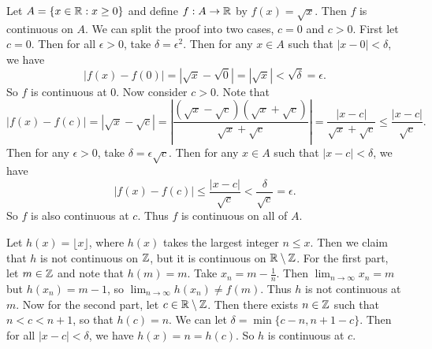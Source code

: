 \begin{example}
  Let $A = \{x \in \mathbb{R} : x \ge 0\}$ and define $f : A \to \mathbb{R}$
  by $f(x) = \sqrt{x}$. Then $f$ is continuous on $A$.
  We can split the proof into two cases, $c = 0$ and $c > 0$.
  First let $c = 0$. Then for all $\epsilon > 0$, take
  $\delta = \epsilon^2$. Then for any $x \in A$ such that
  $|x - 0| < \delta$, we have
  \[
    |f(x) - f(0)| = |\sqrt{x} - \sqrt{0}|
    = |\sqrt{x}| < \sqrt{\delta} = \epsilon
  .\]
  So $f$ is continuous at $0$. Now consider $c > 0$. Note that
  \[|f(x) - f(c)| = |\sqrt{x} - \sqrt{c}| = \left|\frac{(\sqrt{x} - \sqrt{c})(\sqrt{x} + \sqrt{c})}{\sqrt{x} + \sqrt{c}}\right| = \frac{|x - c|}{\sqrt{x} + \sqrt{c}} \le \frac{|x - c|}{\sqrt{c}}.\]
  Then for any $\epsilon > 0$, take $\delta = \epsilon \sqrt{c}$.
  Then for any $x \in A$ such that $|x - c| < \delta$, we have
  \[
  |f(x) - f(c)| \le \frac{|x - c|}{\sqrt{c}} < \frac{\delta}{\sqrt{c}} = \epsilon
  .\]
  So $f$ is also continuous at $c$. Thus $f$ is continuous on
  all of $A$.
\end{example}

\begin{example}
  Let $h(x) = \lfloor x \rfloor$, where $h(x)$ takes the
  largest integer $n \le x$. Then we claim that $h$ is
  not continuous on $\mathbb{Z}$, but it is continuous on $\mathbb{R} \setminus \mathbb{Z}$.
  For the first part, let $m \in \mathbb{Z}$ and note that $h(m) = m$.
  Take $x_n = m - \frac{1}{n}$. Then $\lim_{n \to \infty} x_n = m$
  but $h(x_n) = m - 1$, so $\lim_{n \to \infty} h(x_n) \ne f(m)$.
  Thus $h$ is not continuous at $m$. Now for the second part,
  let $c \in \mathbb{R} \setminus \mathbb{Z}$. Then there exists $n \in \mathbb{Z}$ such
  that $n < c < n + 1$, so that $h(c) = n$. We can let
  $\delta = \min\{c - n, n + 1 - c\}$. Then for all
  $|x - c| < \delta$, we have $h(x) = n = h(c)$. So $h$ is
  continuous at $c$.
\end{example}

